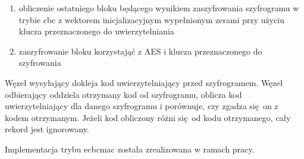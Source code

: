 \begin{enumerate}
\item obliczenie ostatniego bloku będącego wynikiem zaszyfrowania szyfrogramu w trybie \gls{cbc} z wektorem inicjalizacyjnym wypełnionym zerami przy użyciu klucza przeznaczonego do uwierzytelniania
\item zaszyfrowanie bloku korzystająć z AES i klucza przeznaczonego do szyfrowania
\end{enumerate}

Węzeł wysyłający dokleja kod uwierzytelniający przed szyfrogramem. Węzeł odbierający oddziela otrzymany kod od szyfrogramu, oblicza kod uwierzytelniający dla danego szyfrogramu i porównuje, czy zgadza się on z kodem otrzymanym. Jeżeli kod obliczony różni się od kodu otrzymanego, cały rekord jest ignorowany.

Implementacja trybu \gls{ecbcmac} została zrealizowana w ramach pracy.
